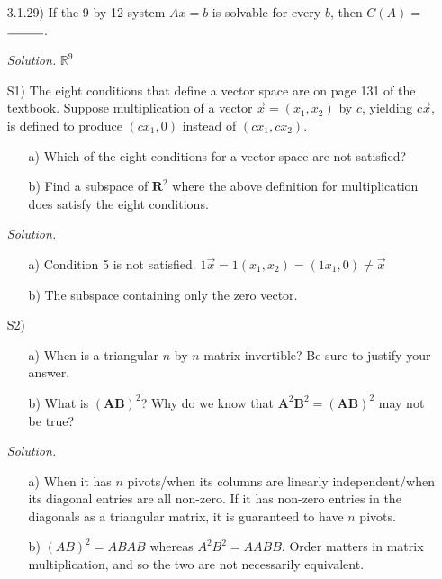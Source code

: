 \documentclass[12pt]{article}
\begin{document}
\begin{itemize}
\item[3.1.29)] If the 9 by 12 system $Ax=b$ is solvable for every $b$, then $C(A)=$ $\rule{1cm}{0.15mm}$.

\textit{Solution.} $\mathbb{R}^9$

\item[S1)] The eight conditions that define a vector space are on page 131 of the textbook.  Suppose multiplication of a vector $\vec{x} = (x_1,x_2)$ by $c$, yielding $c\vec{x}$, is defined to produce $(cx_1,0)$ instead of $(cx_1,cx_2)$.
\begin{itemize}
\item[a)]  Which of the eight conditions for a vector space are not satisfied?
\item[b)] Find a subspace of $\mathbf{R}^2$ where the above definition for multiplication does satisfy the eight conditions.
\end{itemize}
\textit{Solution.}
\begin{itemize}
\item[a)] Condition 5 is not satisfied. $1\vec{x}=1(x_1,x_2)=(1x_1,0)\neq\vec{x}$
\item[b)] The subspace containing only the zero vector.
\end{itemize}

\item[S2)]
\begin{itemize}
\item[a)] When is a triangular $n$-by-$n$ matrix invertible?  Be sure to justify your answer.
\item[b)] What is $(\mathbf{A}\mathbf{B})^2$? Why do we know that $\mathbf{A}^2\mathbf{B}^2 = (\mathbf{AB})^2$ may not be true?
\end{itemize}
\textit{Solution.}
\begin{itemize}
\item[a)] When it has $n$ pivots/when its columns are linearly independent/when its diagonal entries are all non-zero. If it has non-zero entries in the diagonals as a triangular matrix, it is guaranteed to have $n$ pivots.
\item[b)] $(AB)^2=ABAB$ whereas $A^2B^2=AABB$. Order matters in matrix multiplication, and so the two are not necessarily equivalent.
\end{itemize}
\end{itemize}
\end{document}
